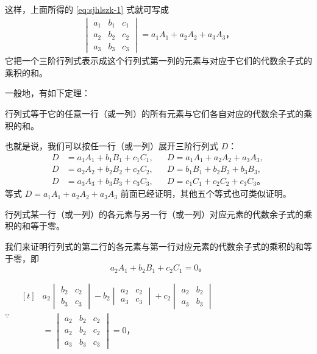 这样，上面所得的 \eqref{eq:sjhlszk-1} 式就可写成
\begin{gather*}
    \begin{vmatrix*}
        a_1 & b_1 & c_1 \\
        a_2 & b_2 & c_2 \\
        a_3 & b_3 & c_3
    \end{vmatrix*} = a_1A_1 + a_2A_2 + a_3A_3 \text{，} \tag{2}\label{eq:sjhlszk-2}
\end{gather*}
它把一个三阶行列式表示成这个行列式第一列的元素与对应于它们的代数余子式的乘积的和。

一般地，有如下定理：

\begin{theorem}\label{theorem:sjhlszk-1}
    行列式等于它的任意一行（或一列）的所有元素与它们各自对应的代数余子式的乘积的和。
\end{theorem}

也就是说，我们可以按任一行（或一列）展开三阶行列式 $D$：
\begin{align*}
    D &= a_1A_1 + b_1B_1 + c_1C_1, && D = a_1A_1 + a_2A_2 + a_3A_3, \\
    D &= a_2A_2 + b_2B_2 + c_2C_2, && D = b_1B_1 + b_2B_2 + b_3B_3, \\
    D &= a_3A_3 + b_3B_3 + c_3C_3, && D = c_1C_1 + c_2C_2 + c_3C_3 \text{。}
\end{align*}
等式 $D = a_1A_1 + a_2A_2 + a_3A_3$ 前面已经证明，其他五个等式也可类似证明。


\begin{theorem}\label{theorem:sjhlszk-2}
    行列式某一行（或一列）的各元素与另一行（或一列）对应元素的代数余子式的乘积的和等于零。
\end{theorem}

\zhengming 我们来证明行列式的第二行的各元素与第一行对应元素的代数余子式的乘积的和等于零，即
$$ a_2A_1 + b_2B_1 + c_2C_1 = 0 \text{。} $$

$\because \quad
\begin{aligned}[t]
  & a_2 \begin{vmatrix}
            b_2 & c_2 \\
            b_3 & c_3
        \end{vmatrix}
    - b_2 \begin{vmatrix}
            a_2 & c_2 \\
            a_3 & c_3
        \end{vmatrix}
    + c_2 \begin{vmatrix}
            a_2 & b_2 \\
            a_3 & b_3
        \end{vmatrix} \\
 &= \begin{vmatrix*}
        a_2 & b_2 & c_2 \\
        a_2 & b_2 & c_2 \\
        a_3 & b_3 & c_3
    \end{vmatrix*}
    = 0 \text{，}
\end{aligned}$

